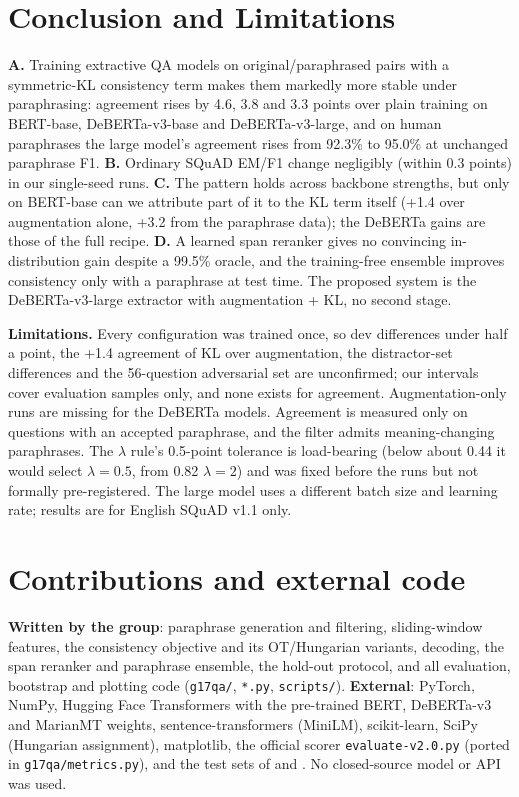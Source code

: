 \documentclass[11pt]{article}
\begin{document}
\section{Conclusion and Limitations}
\textbf{A.} Training extractive QA models on original/paraphrased pairs with a symmetric-KL consistency term makes them markedly more stable under paraphrasing: agreement rises by 4.6, 3.8 and 3.3 points over plain training on BERT-base, DeBERTa-v3-base and DeBERTa-v3-large, and on human paraphrases the large model's agreement rises from 92.3\% to 95.0\% at unchanged paraphrase F1. \textbf{B.} Ordinary SQuAD EM/F1 change negligibly (within 0.3 points) in our single-seed runs. \textbf{C.} The pattern holds across backbone strengths, but only on BERT-base can we attribute part of it to the KL term itself (+1.4 over augmentation alone, +3.2 from the paraphrase data); the DeBERTa gains are those of the full recipe. \textbf{D.} A learned span reranker gives no convincing in-distribution gain despite a 99.5\% oracle, and the training-free ensemble improves consistency only with a paraphrase at test time. The proposed system is the DeBERTa-v3-large extractor with augmentation + KL, no second stage.

\textbf{Limitations.} Every configuration was trained once, so dev differences under half a point, the +1.4 agreement of KL over augmentation, the distractor-set differences and the 56-question adversarial set are unconfirmed; our intervals cover evaluation samples only, and none exists for agreement. Augmentation-only runs are missing for the DeBERTa models. Agreement is measured only on questions with an accepted paraphrase, and the filter admits meaning-changing paraphrases. The $\lambda$ rule's 0.5-point tolerance is load-bearing (below about 0.44 it would select $\lambda=0.5$, from 0.82 $\lambda=2$) and was fixed before the runs but not formally pre-registered. The large model uses a different batch size and learning rate; results are for English SQuAD v1.1 only.

\section*{Contributions and external code}
\textbf{Written by the group}: paraphrase generation and filtering, sliding-window features, the consistency objective and its OT/Hungarian variants, decoding, the span reranker and paraphrase ensemble, the hold-out protocol, and all evaluation, bootstrap and plotting code (\texttt{g17qa/}, \texttt{*.py}, \texttt{scripts/}). \textbf{External}: PyTorch, NumPy, Hugging Face Transformers with the pre-trained BERT, DeBERTa-v3 and MarianMT weights, sentence-transformers (MiniLM), scikit-learn, SciPy (Hungarian assignment), matplotlib, the official scorer \texttt{evaluate-v2.0.py} (ported in \texttt{g17qa/metrics.py}), and the test sets of \citet{gan2019improving} and \citet{jia2017adversarial}. No closed-source model or API was used.

\label{endcontent}\clearpage

\end{document}
